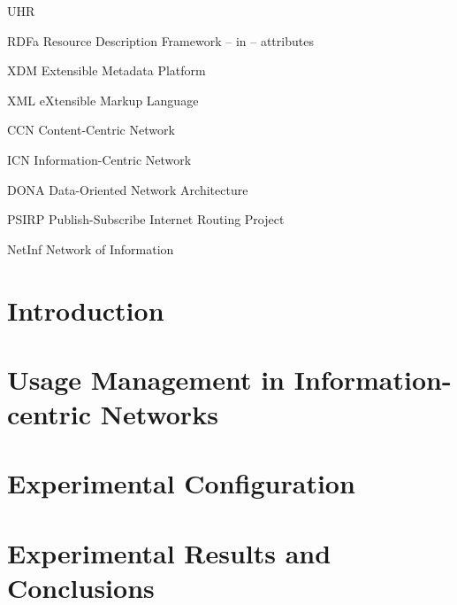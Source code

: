 \documentclass[botnum,fleqn,final]{unmeethesis}
\begin{document}
\tableofcontents
\listoffigures
\listoftables

\begin{glossary}{UHR}
   \item[RDFa] Resource Description Framework -- in -- attributes
   \item[XDM] Extensible Metadata Platform
   \item[XML] eXtensible Markup Language
   \item[CCN] Content-Centric Network
   \item[ICN] Information-Centric Network
   \item[DONA] Data-Oriented Network Architecture
   \item[PSIRP] Publish-Subscribe Internet Routing Project
   \item[NetInf] Network of Information
\end{glossary}

\mainmatter

\chapter{Introduction}








\chapter{Usage Management in Information-centric Networks}





\chapter{Experimental Configuration}
% 


\chapter{Experimental Results and Conclusions}



\pagebreak



\end{document}
